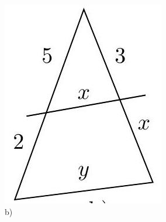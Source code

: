 \documentclass[10pt]{article}
\begin{document}
\includegraphics[max width=\textwidth, center]{2024_11_21_e9b4faa005d5be2cc318g-008(1)}\\
b)\\
\end{document}
